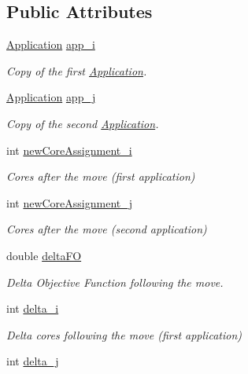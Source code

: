 \subsection*{Public Attributes}
\begin{DoxyCompactItemize}
\item 
\hyperlink{classApplication}{Application} \hyperlink{classCandidate_ac0132d260daf989781ac94fdf494d507}{app\-\_\-i}
\begin{DoxyCompactList}\small\item\em Copy of the first \hyperlink{classApplication}{Application}. \end{DoxyCompactList}\item 
\hyperlink{classApplication}{Application} \hyperlink{classCandidate_ad420293664ad21ac74713b90bfa73f04}{app\-\_\-j}
\begin{DoxyCompactList}\small\item\em Copy of the second \hyperlink{classApplication}{Application}. \end{DoxyCompactList}\item 
int \hyperlink{classCandidate_a859313416296683b7c0496d842dab48a}{new\-Core\-Assignment\-\_\-i}
\begin{DoxyCompactList}\small\item\em Cores after the move (first application) \end{DoxyCompactList}\item 
int \hyperlink{classCandidate_a1203966358bd849169b5f967de3c2bf7}{new\-Core\-Assignment\-\_\-j}
\begin{DoxyCompactList}\small\item\em Cores after the move (second application) \end{DoxyCompactList}\item 
double \hyperlink{classCandidate_a1bfc07aae3b3914bba57e057936399e7}{delta\-F\-O}
\begin{DoxyCompactList}\small\item\em Delta Objective Function following the move. \end{DoxyCompactList}\item 
int \hyperlink{classCandidate_ab1033e1f3e0060f0773c7d9268c2ce0b}{delta\-\_\-i}
\begin{DoxyCompactList}\small\item\em Delta cores following the move (first application) \end{DoxyCompactList}\item 
int \hyperlink{classCandidate_a02528143e2448bfcad797aae2fe1ac90}{delta\-\_\-j}

\end{DoxyCompactItemize}
